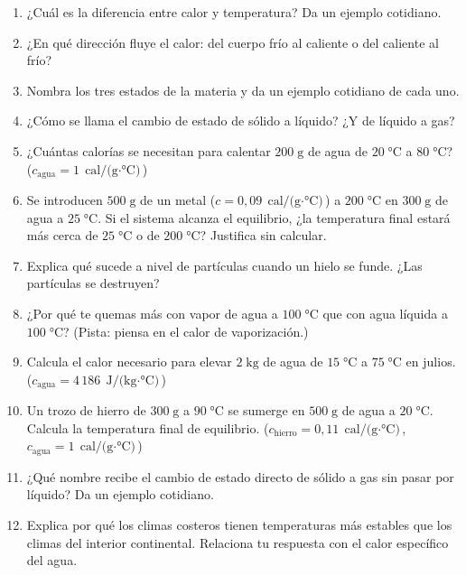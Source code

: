 \documentclass[12pt, a4paper]{article}
\begin{document}
\begin{enumerate}[leftmargin=*, resume]
  \item \facil{} ¿Cuál es la diferencia entre calor y temperatura? Da un ejemplo cotidiano.

  \item \facil{} ¿En qué dirección fluye el calor: del cuerpo frío al caliente o del caliente al frío?

  \item \facil{} Nombra los tres estados de la materia y da un ejemplo cotidiano de cada uno.

  \item \facil{} ¿Cómo se llama el cambio de estado de sólido a líquido? ¿Y de líquido a gas?

  \item \medio{} ¿Cuántas calorías se necesitan para calentar $200\;\text{g}$ de agua de $20\;°\text{C}$ a $80\;°\text{C}$? ($c_{\text{agua}} = 1\;\text{cal/(g$\cdot$°C)}$)

  \item \medio{} Se introducen $500\;\text{g}$ de un metal ($c = 0{,}09\;\text{cal/(g$\cdot$°C)}$) a $200\;°\text{C}$ en $300\;\text{g}$ de agua a $25\;°\text{C}$. Si el sistema alcanza el equilibrio, ¿la temperatura final estará más cerca de $25\;°\text{C}$ o de $200\;°\text{C}$? Justifica sin calcular.

  \item \medio{} Explica qué sucede a nivel de partículas cuando un hielo se funde. ¿Las partículas se destruyen?

  \item \medio{} ¿Por qué te quemas más con vapor de agua a $100\;°\text{C}$ que con agua líquida a $100\;°\text{C}$? (Pista: piensa en el calor de vaporización.)

  \item \dificil{} Calcula el calor necesario para elevar $2\;\text{kg}$ de agua de $15\;°\text{C}$ a $75\;°\text{C}$ en julios. ($c_{\text{agua}} = 4\,186\;\text{J/(kg$\cdot$°C)}$)

  \item \dificil{} Un trozo de hierro de $300\;\text{g}$ a $90\;°\text{C}$ se sumerge en $500\;\text{g}$ de agua a $20\;°\text{C}$. Calcula la temperatura final de equilibrio. ($c_{\text{hierro}} = 0{,}11\;\text{cal/(g$\cdot$°C)}$, $c_{\text{agua}} = 1\;\text{cal/(g$\cdot$°C)}$)

  \item \dificil{} ¿Qué nombre recibe el cambio de estado directo de sólido a gas sin pasar por líquido? Da un ejemplo cotidiano.

  \item \dificil{} Explica por qué los climas costeros tienen temperaturas más estables que los climas del interior continental. Relaciona tu respuesta con el calor específico del agua.
\end{enumerate}
\end{document}
